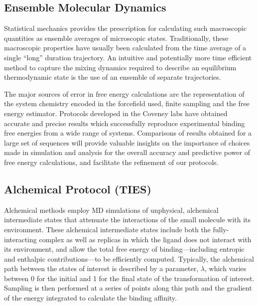 \documentclass[conference]{IEEEtran}
\begin{document}
\subsection{Ensemble Molecular Dynamics}\label{sec:emd}

Statistical mechanics provides the prescription for calculating such macroscopic quantities as ensemble averages of microscopic states. Traditionally, these macroscopic properties have usually been calculated from the time average of a single “long” duration trajectory. An intuitive and potentially more time efficient method to capture the mixing dynamics required to describe an equilibrium thermodynamic state is the use of an ensemble of separate trajectories. \cite{Coveney2016}

The major sources of error in free energy calculations are the representation of the system chemistry encoded in the forcefield used, finite sampling and the free energy estimator. Protocols developed in the Coveney labs have obtained accurate and precise results which successfully reproduce experimental binding free energies from a wide range of systems. \cite{Wright2014, Wan2017brd4, Wan2011, chodera-shirts:jcp:2011:gibbs, Chodera2016} Comparisons of results obtained for a large set of sequences will provide valuable insights on the importance of choices made in simulation and analysis for the overall accuracy and predictive power of free energy calculations, and facilitate the refinement of our protocols.


\subsection{Alchemical Protocol (TIES)}\label{sec:ties}

Alchemical methods employ MD simulations of unphysical, alchemical intermediate states that attenuate the interactions of the small molecule with its environment. These alchemical intermediate states include both the fully-interacting complex as well as replicas in which the ligand does not interact with its environment, and allow the total free energy of binding—including entropic and enthalpic contributions—to be efficiently computed. Typically, the alchemical path between the states of interest is described by a parameter, $\lambda$, which varies between 0 for the initial and 1 for the final state of the transformation of interest. Sampling is then performed at a series of points along this path and the gradient of the energy integrated to calculate the binding affinity.
\end{document}
